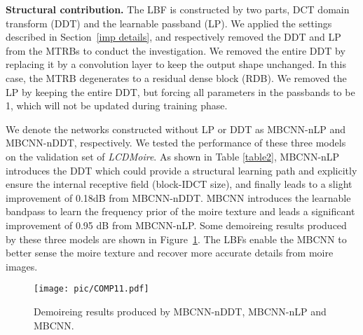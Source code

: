 \documentclass[10pt,twocolumn,letterpaper]{article}
\begin{document}
\begin{table}[h]
\small
  \centering
	\caption{Performance of MBCNN, MBCNN-nLP and MBCNN-nDDT on \textit{LCDMoire} validation set.}
	\label{table2}
\end{table}
\textbf{Structural contribution.} 
The LBF is constructed by two parts, DCT domain transform (DDT) and the learnable passband (LP). 
We applied the settings described in Section~\ref{imp details}, and respectively removed the DDT and LP from the MTRBs to conduct the investigation. 
We removed the entire DDT by replacing it by a  convolution layer to keep the output shape unchanged. In this case, the MTRB degenerates to a residual dense block (RDB). 
We removed the LP by keeping the entire DDT, but forcing all parameters in the passbands to be 1, which will not be updated during training phase.

We denote the networks constructed without LP or DDT as MBCNN-nLP and MBCNN-nDDT, respectively. 
We tested the performance of these three models on the validation set of \emph{LCDMoire}. 
As shown in Table \ref{table2}, MBCNN-nLP introduces the DDT which could provide a structural learning path and explicitly ensure the internal receptive field (block-IDCT size), and finally leads to a slight improvement of 0.18dB from MBCNN-nDDT. 
MBCNN introduces the learnable bandpass to learn the frequency prior of the moire texture and leads a significant improvement of 0.95 dB from MBCNN-nLP. 
Some demoireing results produced by these three models are shown in Figure~\ref{demoire_comp_1}. 
The LBFs enable the MBCNN to better sense the moire texture and recover more accurate details from moire images.

\begin{figure}[t]
	\centering
	\texttt{[image: pic/COMP11.pdf]}
	\caption{Demoireing results produced by MBCNN-nDDT, MBCNN-nLP and MBCNN.}
	\label{demoire_comp_1}
\end{figure}



\begin{table}[ht]
\normalsize 
  \centering
  \caption{Comparison of MBCNNs with different  values.}
\label{table3}
\end{table}
\end{document}
